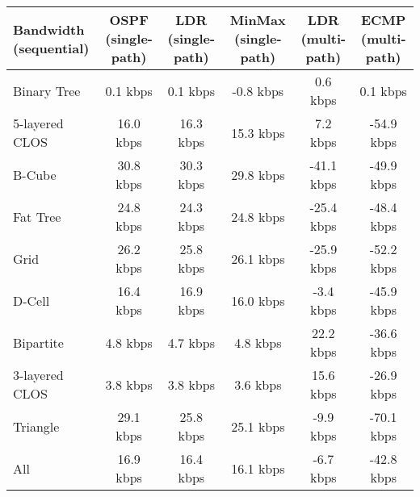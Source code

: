 \begin{tabular}{l|ccccc}
Bandwidth (sequential) & OSPF (single-path) & LDR (single-path) & MinMax (single-path) & LDR (multi-path) & ECMP (multi-path) \\
\hline
Binary Tree            & 0.1 kbps           & 0.1 kbps          & -0.8 kbps            & 0.6 kbps         & 0.1 kbps          \\
5-layered CLOS         & 16.0 kbps          & 16.3 kbps         & 15.3 kbps            & 7.2 kbps         & -54.9 kbps        \\
B-Cube                 & 30.8 kbps          & 30.3 kbps         & 29.8 kbps            & -41.1 kbps       & -49.9 kbps        \\
Fat Tree               & 24.8 kbps          & 24.3 kbps         & 24.8 kbps            & -25.4 kbps       & -48.4 kbps        \\
Grid                   & 26.2 kbps          & 25.8 kbps         & 26.1 kbps            & -25.9 kbps       & -52.2 kbps        \\
D-Cell                 & 16.4 kbps          & 16.9 kbps         & 16.0 kbps            & -3.4 kbps        & -45.9 kbps        \\
Bipartite              & 4.8 kbps           & 4.7 kbps          & 4.8 kbps             & 22.2 kbps        & -36.6 kbps        \\
3-layered CLOS         & 3.8 kbps           & 3.8 kbps          & 3.6 kbps             & 15.6 kbps        & -26.9 kbps        \\
Triangle               & 29.1 kbps          & 25.8 kbps         & 25.1 kbps            & -9.9 kbps        & -70.1 kbps        \\
All                    & 16.9 kbps          & 16.4 kbps         & 16.1 kbps            & -6.7 kbps        & -42.8 kbps        \\
\end{tabular}